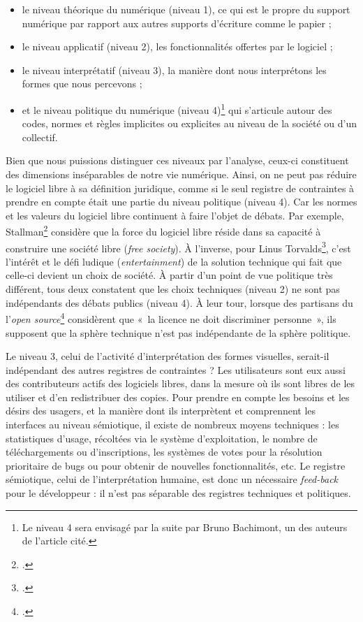 \documentclass{FramateX}
\begin{document}
\begin{refsection}
\begin{itemize}
\item le niveau théorique du numérique (niveau 1), ce qui est le propre
du support numérique par rapport aux autres supports d'écriture comme
le papier ;
\item le niveau applicatif (niveau 2), les fonctionnalités offertes par
le logiciel ; 
\item le niveau interprétatif (niveau 3), la manière dont nous
interprétons les formes que nous percevons ; 
\item et le niveau politique du numérique (niveau 4)\footnote{Le niveau 4 sera envisagé par la suite par Bruno Bachimont, un des auteurs de l'article cité. } qui s'articule
autour des codes, normes et règles implicites ou explicites au niveau
de la société ou d'un collectif.
\end{itemize}

Bien que nous puissions distinguer ces niveaux par l'analyse, ceux-ci
constituent des dimensions inséparables de notre vie numérique. Ainsi,
on ne peut pas réduire le logiciel libre à sa définition juridique,
comme si le seul registre de contraintes à prendre en compte était une
partie du niveau politique (niveau 4). Car les normes et les valeurs du
logiciel libre continuent à faire l'objet de débats. Par exemple,
Stallman\footnote{\cite{stallmanfree2002}.} considère que la force du logiciel
libre réside dans sa capacité à construire une société libre
(\textit{free society}). À l'inverse, pour Linus Torvalds\footnote{\cite{torvaldil2001}.}, c'est l'intérêt et le défi ludique
(\textit{entertainment}) de la solution technique qui fait que celle-ci
devient un choix de société. À partir d'un point de vue politique très
différent, tous deux constatent que les choix techniques (niveau 2) ne
sont pas indépendants des débats publics (niveau 4). À leur tour,
lorsque des partisans du l'\textit{open source}\footnote{\cite{dibonaopen1999-1}.}
considèrent que «~la licence ne doit discriminer personne~», ils
supposent que la sphère technique n'est pas indépendante de la sphère
politique.

Le niveau 3, celui de l'activité d'interprétation des formes visuelles,
serait-il indépendant des autres registres de contraintes ? Les
utilisateurs sont eux aussi des contributeurs actifs des logiciels
libres, dans la mesure où ils sont libres de les utiliser et d'en
redistribuer des copies. Pour prendre en compte les besoins et les
désirs des usagers, et la manière dont ils interprètent et comprennent
les interfaces au niveau sémiotique, il existe de nombreux moyens
techniques : les statistiques d'usage, récoltées via le système
d'exploitation, le nombre de téléchargements ou d'inscriptions, les
systèmes de votes pour la résolution prioritaire de bugs ou pour
obtenir de nouvelles fonctionnalités, etc. Le registre sémiotique,
celui de l'interprétation humaine, est donc un nécessaire
\textit{feed-back} pour le développeur : il n'est pas séparable
des registres techniques et politiques. 


\end{refsection}
\end{document}
